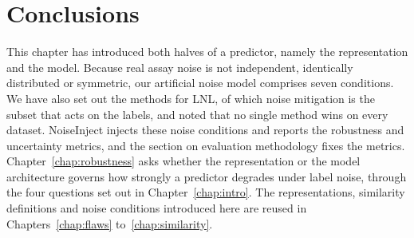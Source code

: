 \section{Conclusions}


This chapter has introduced both halves of a predictor, namely the representation and the model. Because real assay noise is not independent, identically distributed or symmetric, our artificial noise model comprises seven conditions. We have also set out the methods for LNL, of which noise mitigation is the subset that acts on the labels, and noted that no single method wins on every dataset. NoiseInject injects these noise conditions and reports the robustness and uncertainty metrics, and the section on evaluation methodology fixes the metrics. Chapter~\ref{chap:robustness} asks whether the representation or the model architecture governs how strongly a predictor degrades under label noise, through the four questions set out in Chapter~\ref{chap:intro}. The representations, similarity definitions and noise conditions introduced here are reused in Chapters~\ref{chap:flaws} to~\ref{chap:similarity}.

